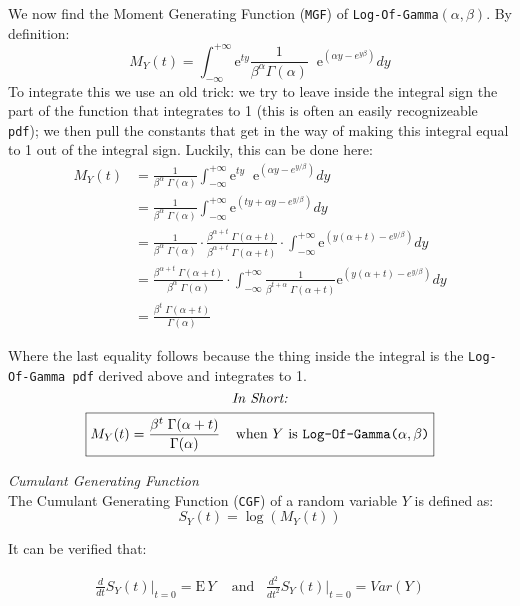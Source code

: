 \documentclass[12pt]{article}
\begin{document}
We now find the Moment Generating Function (\texttt{MGF}) of \texttt{Log-Of-Gamma}$(\alpha, \beta)$. By definition:
$$
M_Y(t) = \int_{-\infty}^{+\infty} \mathrm{e}^{ty} \frac{1}{\beta^\alpha \Gamma(\alpha)} \;\; \mathrm{e}^{\left(\alpha y - e^{y\beta}\right)} dy
$$
To integrate this we use an old trick: we try to leave inside the integral sign the part of the function that integrates to 1 (this is often an easily recognizeable \texttt{pdf}); we then pull the constants that get in the way of making this integral equal to 1 out of the integral sign. Luckily, this can be done here:
\begin{align*}
M_Y(t) &= \frac{1}{\beta^\alpha \; \Gamma(\alpha)} \int_{-\infty}^{+\infty} \mathrm{e}^{ty} \;\; \mathrm{e}^{\left(\alpha y - e^{y/\beta}\right)} dy\\
&= \frac{1}{\beta^\alpha \; \Gamma(\alpha)} \int_{-\infty}^{+\infty} \mathrm{e}^{\left(ty +\alpha y - e^{y/\beta}\right)} dy\\
&= \frac{1}{\beta^\alpha \; \Gamma(\alpha)} \cdot \frac{\beta^{\alpha + t} \; \Gamma(\alpha + t)}{\beta^{\alpha + t} \; \Gamma(\alpha + t)} \cdot \int_{-\infty}^{+\infty} \mathrm{e}^{\left(y(\alpha + t) - e^{y/\beta}\right)} dy\\
&= \frac{ \beta^{\alpha + t} \; \Gamma(\alpha + t) }{\beta^\alpha \; \Gamma(\alpha)}  \cdot \int_{-\infty}^{+\infty} \frac{1}{\beta^{t+\alpha} \; \Gamma(\alpha + t)} \mathrm{e}^{\left(y(\alpha + t) - e^{y/\beta}\right)} dy\\
&= \frac{\beta^t \; \Gamma(\alpha + t)}{\Gamma(\alpha)} 
\end{align*}

Where the last equality follows because the thing inside the integral is the \texttt{Log-Of-Gamma pdf} derived above and integrates to 1.
\bigskip
$$\text{\emph{In Short:}}$$
$$
\boxed{M_Y(t) = \frac{\beta^t \; \Gamma(\alpha + t)}{\Gamma(\alpha)}   \; \; \; \; \text{when $Y$ is \texttt{Log-Of-Gamma($\alpha, \beta$)}} }
$$

\bigskip 
\bigskip 

{\color{TealBlue}\emph{Cumulant Generating Function} }\\

The Cumulant Generating Function (\texttt{CGF}) of a random variable $Y$ is defined as:
$$
S_Y(t) = \log (M_Y(t))
$$

It can be verified that:


\begin{align*}
\frac{d}{dt} S_Y(t) \Big|_{t=0} = \mathrm{E}\, Y \;\;\; \text{ and} \;\;\; \frac{d^2}{dt^2} S_Y(t) \Big|_{t=0} = Var(Y) 
\end{align*}
\end{document}
